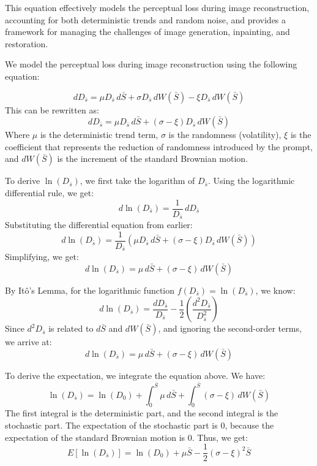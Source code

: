 \documentclass[conference]{IEEEtran}
\begin{document}
This equation effectively models the perceptual loss during image reconstruction, accounting for both deterministic trends and random noise, and provides a framework for managing the challenges of image generation, inpainting, and restoration.


We model the perceptual loss during image reconstruction using the following equation:

\[
    dD_{\bar{s}} = \mu D_{\bar{s}} \, d\bar{S} + \sigma D_{\bar{s}} \, dW(\bar{S}) - \xi D_{\bar{s}} \, dW(\bar{S})
    \]
    This can be rewritten as:
    \[
    dD_{\bar{s}} = \mu D_{\bar{s}} \, d\bar{S} + (\sigma - \xi) D_{\bar{s}} \, dW(\bar{S})
    \]
    Where \( \mu \) is the deterministic trend term, \( \sigma \) is the randomness (volatility), \( \xi \) is the coefficient that represents the reduction of randomness introduced by the prompt, and \( dW(\bar{S}) \) is the increment of the standard Brownian motion.

    To derive \( \ln(D_{\bar{s}}) \), we first take the logarithm of \( D_{\bar{s}} \). Using the logarithmic differential rule, we get:
    \[
    d \ln(D_{\bar{s}}) = \frac{1}{D_{\bar{s}}} \, dD_{\bar{s}}
    \]
    Substituting the differential equation from earlier:
    \[
    d \ln(D_{\bar{s}}) = \frac{1}{D_{\bar{s}}} \left( \mu D_{\bar{s}} \, d\bar{S} + (\sigma - \xi) D_{\bar{s}} \, dW(\bar{S}) \right)
    \]
    Simplifying, we get:
    \[
    d \ln(D_{\bar{s}}) = \mu \, d\bar{S} + (\sigma - \xi) \, dW(\bar{S})
    \]

    By Itô's Lemma, for the logarithmic function \( f(D_{\bar{s}}) = \ln(D_{\bar{s}}) \), we know:
    \[
    d \ln(D_{\bar{s}}) = \frac{dD_{\bar{s}}}{D_{\bar{s}}} - \frac{1}{2} \left( \frac{d^2 D_{\bar{s}}}{D_{\bar{s}}^2} \right)
    \]
    Since \( d^2 D_{\bar{s}} \) is related to \( d\bar{S} \) and \( dW(\bar{S}) \), and ignoring the second-order terms, we arrive at:
    \[
    d \ln(D_{\bar{s}}) = \mu \, d\bar{S} + (\sigma - \xi) \, dW(\bar{S})
    \]

    To derive the expectation, we integrate the equation above. We have:
    \[
    \ln(D_{\bar{s}}) = \ln(D_0) + \int_0^{\bar{S}} \mu \, d\bar{S} + \int_0^{\bar{S}} (\sigma - \xi) \, dW(\bar{S})
    \]
    The first integral is the deterministic part, and the second integral is the stochastic part. The expectation of the stochastic part is 0, because the expectation of the standard Brownian motion is 0. Thus, we get:
    \[
    E[\ln(D_{\bar{s}})] = \ln(D_0) + \mu \bar{S} - \frac{1}{2} (\sigma - \xi)^2 \bar{S}
    \]
\end{document}
